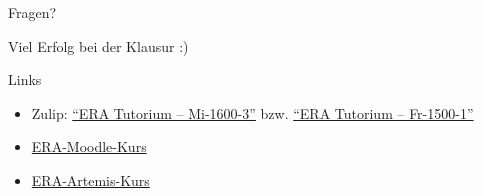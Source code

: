 \begin{frame}[c]{}{}
	\begin{center}
		\LARGE Fragen?
	\end{center}
\end{frame}


\begin{frame}[c]{}{}
	\begin{center}
		\LARGE Viel Erfolg bei der Klausur :)
	\end{center}
\end{frame}

\begin{frame}[c, fragile]{Links}{}
	\begin{itemize}
		\item Zulip: \href{https://zulip.in.tum.de/#narrow/channel/3255-ERA-Tutorium-.E2.80.93-Mi-1600-3}{\enquote{ERA Tutorium -- Mi-1600-3}}
		      bzw. \href{https://zulip.in.tum.de/#narrow/channel/3264-ERA-Tutorium-.E2.80.93-Fr-1500-1}{\enquote{ERA Tutorium -- Fr-1500-1}}
		\item \href{https://www.moodle.tum.de/course/view.php?id=111440}{ERA-Moodle-Kurs}
		\item \href{https://artemis.tum.de/courses/516}{ERA-Artemis-Kurs}
	\end{itemize}
\end{frame}

\maketitle


